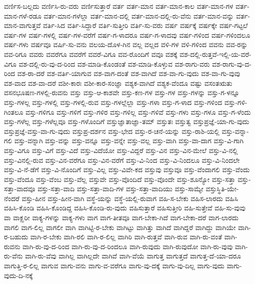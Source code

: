 {ವರ್ಣಿಸ-ಬಲ್ಲದು
ವರ್ಣಿಸಿ-ರು-ವರು
ವರ್ಣಿಸುತ್ತಾರೆ
ವರ್ತ
ವರ್ತ-ಮಾನ
ವರ್ತ-ಮಾನ-ಕಾಲ
ವರ್ತ-ಮಾನ-ಗಳ
ವರ್ತ-ಮಾನ-ಗಳೆ-ರಡೂ
ವರ್ತ-ಮಾನ-ಗಳೆಲ್ಲಾ
ವರ್ತ-ಮಾನ-ದಲ್ಲಿ
ವರ್ತ-ಮಾನ-ದಲ್ಲಿ-ರು-ವೆನು
ವರ್ತ-ಮಾನ-ವನ್ನು
ವರ್ತ-ಮಾನ-ವಾಗುತ್ತವೆ
ವರ್ತಿ-ಸಿದ
ವರ್ತಿ-ಸಿದ್ದಾರೆ
ವರ್ತಿ-ಸುತ್ತೀರಿ
ವರ್ತಿ-ಸು-ವರು
ವರ್ಷ
ವರ್ಷಕ್ಕೆ
ವರ್ಷಕ್ಕೇ
ವರ್ಷ-ಗಟ್ಟಲೆ
ವರ್ಷ-ಗಳ
ವರ್ಷ-ಗಳಲ್ಲಿ
ವರ್ಷ-ಗಳ-ವರೆಗೆ
ವರ್ಷ-ಗ-ಳಾದರೂ
ವರ್ಷ-ಗ-ಳಾದವು
ವರ್ಷ-ಗಳಿಂದ
ವರ್ಷ-ಗಳಿಂದಲೂ
ವರ್ಷ-ಗಳು
ವರ್ಷವೂ
ವರ್ಷಿ-ಸು-ವನು
ವಲಯ-ದೊಳ-ಗಿನ
ವಲ್ಲ
ವಲ್ಲದ
ವಳಿ-ಗಳ
ವಳಿ-ಗಳಿಂದ
ವವನು
ವವ-ರನ್ನು
ವವ-ರಿಗೂ
ವವರು
ವವರೆಗೂ
ವವರೆಗೆ
ವವರೆ-ವಿಗೂ
ವವ-ರೊಂದಿಗೆ
ವವೂ
ವಶಕ್ಕೆ
ವಶ-ದಲ್ಲಿ-ರುತ್ತವೆ-ಇಲ್ಲಿ-ಯ-ವರೆ-ವಿಗೂ
ವಶ-ದಲ್ಲಿ-ರು-ವು-ದ-ರಿಂದ
ವಶ-ಮಾಡಿ-ಕೊಂಡಂತೆ
ವಶ-ಮಾಡಿ-ಕೊಳ್ಳುವ
ವಶ-ರಾಗು-ವರು
ವಶ-ರಾಗು-ವು-ದ-ರಿಂದ
ವಶ-ರಾ-ದರೆ
ವಶ-ವರ್ತಿ-ಯಾಗುವ
ವಶ-ವಾಗ-ದಂತೆ
ವಶ-ವಾಗಿದೆ
ವಶ-ವಾ-ಗು-ವುದು
ವಶ-ವಾ-ಗು-ವುವು
ವಶ-ವಾದ
ವಶ-ವಾ-ದರೆ
ವಶೀ-ಕಾರಃ
ವಶೀ-ಕಾರ-ಸಂಜ್ಞಾ
ವಶ್ಯಕ-ವಾಗಿದೆ
ವಶ್ಯಕ-ವೆಂದೂ
ವಷ್ಟು
ವಸಂತಋತು
ವಸನಭೂಷಣ-ಗಳಲ್ಲಿ-ರುವನು
ವಸ್ತು
ವಸ್ತು-ಆ-ಕಾಶವೇ
ವಸ್ತು-ಕಣ-ಗಳ
ವಸ್ತು-ಗಳ
ವಸ್ತು-ಗಳನ್ನು
ವಸ್ತು-ಗ-ಳನ್ನೂ
ವಸ್ತು-ಗಳಲ್ಲ
ವಸ್ತು-ಗಳಲ್ಲಿ
ವಸ್ತು-ಗಳಲ್ಲಿ-ರುವ
ವಸ್ತು-ಗಳಲ್ಲೆಲ್ಲಾ
ವಸ್ತು-ಗಳಾ
ವಸ್ತು-ಗ-ಳಾದ
ವಸ್ತು-ಗಳಿಂದ
ವಸ್ತು-ಗಳಿ-ಗಿಂತಲೂ
ವಸ್ತು-ಗಳಿಗೂ
ವಸ್ತು-ಗಳಿಗೆ
ವಸ್ತು-ಗಳಿರ
ವಸ್ತು-ಗಳಿಲ್ಲ
ವಸ್ತು-ಗಳಿವೆ
ವಸ್ತು-ಗಳು
ವಸ್ತು-ಗಳೂ
ವಸ್ತು-ಗ-ಳೆಂದು
ವಸ್ತು-ಗಳೆಲ್ಲ
ವಸ್ತು-ಗಳೆಲ್ಲವೂ
ವಸ್ತು-ಗಳೊಂದಿಗೆ
ವಸ್ತುಜ್ಞಾತಾಜ್ಞಾ-ತಮ್
ವಸ್ತುತಃ
ವಸ್ತುತ್ವ
ವಸ್ತುಪ್ರಜ್ಞೆ-ಯಾ-ಗು-ವುದು
ವಸ್ತುಪ್ರಜ್ಞೆ-ವಸ್ತು-ವಾ-ಗು-ವುದು
ವಸ್ತುಪ್ರ-ದರ್ಶನ
ವಸ್ತು-ಭೇದ
ವಸ್ತು-ರ-ಚನೆ-ಯನ್ನು
ವಸ್ತು-ರಾಶಿ-ಯಲ್ಲಿ
ವಸ್ತು-ವನ್ನಾ-ಗಲಿ
ವಸ್ತು-ವನ್ನಾಗಿ
ವಸ್ತು-ವನ್ನು
ವಸ್ತು-ವನ್ನೂ
ವಸ್ತು-ವನ್ನೇ
ವಸ್ತು-ವಲ್ಲ
ವಸ್ತು-ವಾಗಿ
ವಸ್ತು-ವಾ-ದಾಗ
ವಸ್ತು-ವಿ-ಗಾಗಿ
ವಸ್ತು-ವಿಗೂ
ವಸ್ತು-ವಿಗೆ
ವಸ್ತು-ವಿದೆ
ವಸ್ತು-ವಿದೆಯೋ
ವಸ್ತು-ವಿದ್ದರೆ
ವಸ್ತು-ವಿನ
ವಸ್ತು-ವಿನ-ಮೇಲೆ
ವಸ್ತು-ವಿ-ನಲ್ಲಿ
ವಸ್ತು-ವಿನಲ್ಲಿ-ರುವ
ವಸ್ತು-ವಿನ-ವರೆಗೂ
ವಸ್ತು-ವಿನ-ವರೆಗೆ
ವಸ್ತು-ವಿ-ನಿಂದ
ವಸ್ತು-ವಿ-ನಿಂದಲೂ
ವಸ್ತು-ವಿ-ನಿಂದಲೇ
ವಸ್ತು-ವಿ-ನೆ-ಡೆಗೆ
ವಸ್ತು-ವಿ-ನೊಂದಿಗೆ
ವಸ್ತು-ವಿಲ್ಲ
ವಸ್ತು-ವಿವೇ-ಕದ
ವಸ್ತುವು
ವಸ್ತುವೂ
ವಸ್ತು-ವೆಂದಾಗಲಿ
ವಸ್ತು-ವೆಂದು
ವಸ್ತು-ವೆಂದೂ
ವಸ್ತು-ವೆಂಬ
ವಸ್ತು-ವೆಲ್ಲ
ವಸ್ತುವೇ
ವಸ್ತು-ವೊಂದಿದೆ
ವಸ್ತು-ವೊಂದೇ
ವಸ್ತು-ಶೂನ್ಯೋ
ವಸ್ತು-ಸತ್ತಾ
ವಸ್ತು-ಸತ್ತಾ-ವಾದವೂ
ವಸ್ತು-ಸತ್ತಾ-ವಾದಿ
ವಸ್ತು-ಸತ್ತಾ-ವಾದಿ-ಗಳ
ವಸ್ತು-ಸತ್ತಾ-ವಾದಿಯು
ವಸ್ತು-ಸಾಮ್ಯೇ
ವಸ್ತುಸ್ಥಿತಿ-ಯೇ-ನೆಂದರೆ
ವಸ್ತು-ಹೀನ
ವಸ್ತು-ಹೀನ-ವಾಗಿ
ವಸ್ಥೆ-ಯನ್ನು
ವಸ್ಥೆ-ಯಲ್ಲಿ-ರುವಾಗ
ವಹಿ-ಸ-ಬೇಕು
ವಹಿಸ-ಲಾರದು
ವಹಿಸಿ
ವಹಿಸಿ-ಕೊಂಡಿ
ವಹಿಸಿ-ಕೊಂಡಿದ್ದ
ವಹಿಸಿ-ಕೊಂಡಿ-ರು-ವುದು
ವಹಿಸುತ್ತಾರೆ
ವಹಿಸುತ್ತೀರಿ
ವಹಿ-ಸುತ್ತೇವೆ
ವಹಿ-ಸು-ವುವು
ವಾ
ವಾಕ್ಝರೀ
ವಾಕ್ಯ-ಗಳನ್ನು
ವಾಕ್ಯ-ಗಳು
ವಾಗ
ವಾಗ-ತೀತವೂ
ವಾಗ-ಬೇಕಾ-ಗಿದೆ
ವಾಗ-ಬೇಕಾ-ದರೆ
ವಾಗ-ಲಾರದು
ವಾಗಲಿ
ವಾಗ-ಲಿಲ್ಲ
ವಾಗಲೀ
ವಾಗಿ
ವಾಗಿಟ್ಟಿ-ರ-ಬೇಕು
ವಾಗಿಟ್ಟು
ವಾಗಿತ್ತು
ವಾಗಿದೆ
ವಾಗಿದ್ದರೆ
ವಾಗಿದ್ದು
ವಾಗಿಯೇ
ವಾಗಿ-ರ-ಬಹುದು
ವಾಗಿ-ರ-ಬೇಕು
ವಾಗಿ-ರಲಿ
ವಾಗಿ-ರ-ಲಿಲ್ಲ
ವಾಗಿರಿ
ವಾಗಿ-ರುತ್ತವೆ
ವಾಗಿ-ರುವ
ವಾಗಿ-ರು-ವಂತೆ
ವಾಗಿ-ರುವನು
ವಾಗಿ-ರು-ವು-ದ-ರಿಂದ
ವಾಗಿ-ರು-ವು-ದ-ರಿಂದಲೂ
ವಾಗಿ-ರುವುದು
ವಾಗಿ-ರುವುದೋ
ವಾಗಿ-ರು-ವುವು
ವಾಗಿ-ರು-ವೆನು
ವಾಗಿ-ರು-ವೆವು
ವಾಗಿಲ್ಲ
ವಾಗಿಲ್ಲದೇ
ವಾಗಿವೆ
ವಾಗಿ-ವೆಯೆ
ವಾಗುತ್ತ
ವಾಗುತ್ತದೆ
ವಾಗುತ್ತ-ದೆ-ಯಾ-ದರೂ
ವಾಗುತ್ತಿ-ರ-ಲಿಲ್ಲ
ವಾಗುವ
ವಾಗು-ವನು
ವಾಗು-ವ-ವರೆಗೂ
ವಾಗು-ವು-ದಕ್ಕೆ
ವಾಗು-ವು-ದಿಲ್ಲ
ವಾಗು-ವುದು
ವಾಗು-ವುದು-ದಿ-ನಕ್ಕೆ
}
